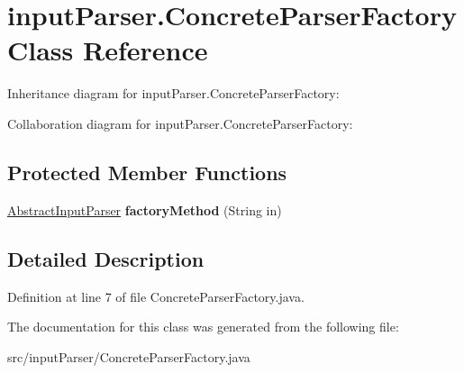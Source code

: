 \hypertarget{classinput_parser_1_1_concrete_parser_factory}{\section{input\-Parser.\-Concrete\-Parser\-Factory Class Reference}
\label{classinput_parser_1_1_concrete_parser_factory}
}


Inheritance diagram for input\-Parser.\-Concrete\-Parser\-Factory\-:


Collaboration diagram for input\-Parser.\-Concrete\-Parser\-Factory\-:
\subsection*{Protected Member Functions}
\begin{DoxyCompactItemize}
\item 
\hypertarget{classinput_parser_1_1_concrete_parser_factory_a6fdfbfef9e48417903f60faf67640d1e}{\hyperlink{classinput_parser_1_1_abstract_input_parser}{Abstract\-Input\-Parser} {\bfseries factory\-Method} (String in)}\label{classinput_parser_1_1_concrete_parser_factory_a6fdfbfef9e48417903f60faf67640d1e}

\end{DoxyCompactItemize}


\subsection{Detailed Description}


Definition at line 7 of file Concrete\-Parser\-Factory.\-java.



The documentation for this class was generated from the following file\-:\begin{DoxyCompactItemize}
\item 
src/input\-Parser/Concrete\-Parser\-Factory.\-java\end{DoxyCompactItemize}

